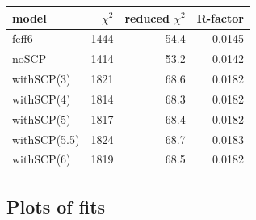 \documentclass[11pt]{article}
\begin{document}
\begin{center}
  \begin{tabular}{lrrr}
    model & $\chi^2$ & reduced $\chi^2$ & R-factor\\
    \hline
    feff6        & 1444 & 54.4 & 0.0145\\
    noSCP        & 1414 & 53.2 & 0.0142\\
    withSCP(3)   & 1821 & 68.6 & 0.0182\\
    withSCP(4)   & 1814 & 68.3 & 0.0182\\
    withSCP(5)   & 1817 & 68.4 & 0.0182\\
    withSCP(5.5) & 1824 & 68.7 & 0.0183\\
    withSCP(6)   & 1819 & 68.5 & 0.0182\\
  \end{tabular}
\end{center}





\subsection{Plots of fits}
\label{sec:orgheadline5}
\end{document}
